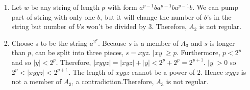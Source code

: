 \begin{enumerate}
\begin{enumerate}
              \item Let $w$ be any string of length $p$ with form $a^{p-1}ba^{p-1}ba^{p-1}b$. We can pump part of string with only one $b$, but it will change the number of $b$'s in the string but number of $b$'s won't be divided by 3. Therefore, $A_2$ is not regular.

              \item Choose s to be the string $a^{2^p}$. Because $s$ is a member of $A_3$ and $s$ is longer than $p$, can be split into three pieces, $s = xyz$. $|xy|\geq p$. Furthermore, $p < 2^p$ and so $|y| < 2^p$. Therefore, $|xyyz| = |xyz|+|y| < 2^p+2^p =2^{p+1}$. $|y| > 0$ so $2^p < |xyyz| < 2^{p+1}$. The length of $xyyz$ cannot be a power of $2$. Hence $xyyz$ is not a member of $A_3$, a contradiction.Therefore, $A_3$ is not regular.
          \end{enumerate}
\end{enumerate}
